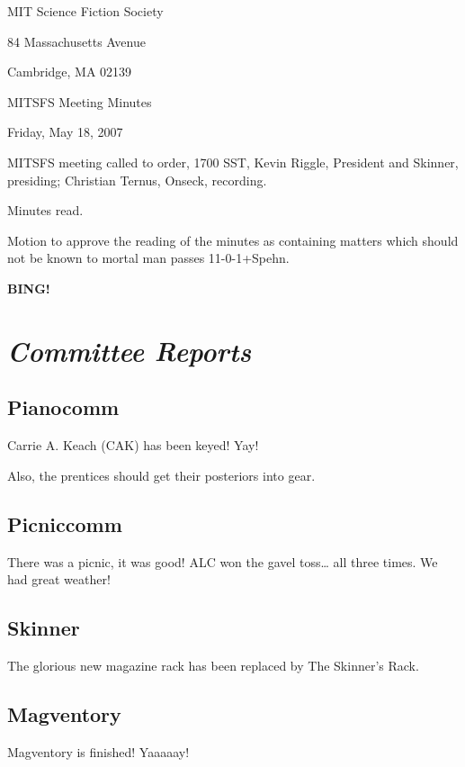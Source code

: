 \documentclass[10pt]{article}
\newcommand{\bing}{{\bf BING!} }
\newcommand{\goto}[1]{\bing \vskip 12pt \section*{{\em{#1}}}}
\begin{document}
\begin{center}

MIT Science Fiction Society

84 Massachusetts Avenue

Cambridge, MA 02139

\vspace{12pt}

MITSFS Meeting Minutes

Friday, May 18, 2007

\end{center}

\vspace{18pt}

\setlength{\parskip}{6pt}

\noindent
MITSFS meeting called to order, 1700 SST,
Kevin Riggle, President and Skinner, presiding; Christian Ternus, Onseck, recording.

Minutes read.

Motion to approve the reading of the minutes as containing matters which should not be known to mortal man passes 11-0-1+Spehn.

\goto{Committee Reports}

\subsection*{Pianocomm}

Carrie A. Keach (CAK) has been keyed!  Yay!

Also, the prentices should get their posteriors into gear. 

\subsection*{Picniccomm}

There was a picnic, it was good!  ALC won the gavel toss\ldots{} all three times.  We had great weather!

\subsection*{Skinner}

The glorious new magazine rack has been replaced by The Skinner's Rack. 

\subsection*{Magventory}

Magventory is finished!  Yaaaaay!
\end{document}
